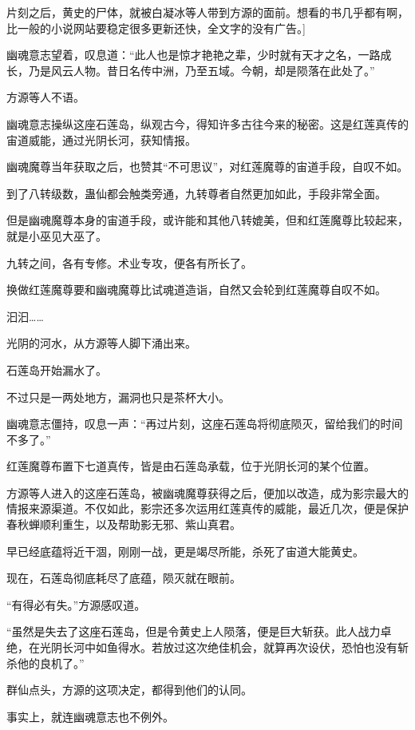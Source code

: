 
\begin{this_body}

片刻之后，黄史的尸体，就被白凝冰等人带到方源的面前。想看的书几乎都有啊，比一般的小说网站要稳定很多更新还快，全文字的没有广告。]

幽魂意志望着，叹息道：“此人也是惊才艳艳之辈，少时就有天才之名，一路成长，乃是风云人物。昔日名传中洲，乃至五域。今朝，却是陨落在此处了。”

方源等人不语。

幽魂意志操纵这座石莲岛，纵观古今，得知许多古往今来的秘密。这是红莲真传的宙道威能，通过光阴长河，获知情报。

幽魂魔尊当年获取之后，也赞其“不可思议”，对红莲魔尊的宙道手段，自叹不如。

到了八转级数，蛊仙都会触类旁通，九转尊者自然更加如此，手段非常全面。

但是幽魂魔尊本身的宙道手段，或许能和其他八转媲美，但和红莲魔尊比较起来，就是小巫见大巫了。

九转之间，各有专修。术业专攻，便各有所长了。

换做红莲魔尊要和幽魂魔尊比试魂道造诣，自然又会轮到红莲魔尊自叹不如。

汩汩……

光阴的河水，从方源等人脚下涌出来。

石莲岛开始漏水了。

不过只是一两处地方，漏洞也只是茶杯大小。

幽魂意志僵持，叹息一声：“再过片刻，这座石莲岛将彻底陨灭，留给我们的时间不多了。”

红莲魔尊布置下七道真传，皆是由石莲岛承载，位于光阴长河的某个位置。

方源等人进入的这座石莲岛，被幽魂魔尊获得之后，便加以改造，成为影宗最大的情报来源渠道。不仅如此，影宗还多次运用红莲真传的威能，最近几次，便是保护春秋蝉顺利重生，以及帮助影无邪、紫山真君。

早已经底蕴将近干涸，刚刚一战，更是竭尽所能，杀死了宙道大能黄史。

现在，石莲岛彻底耗尽了底蕴，陨灭就在眼前。

“有得必有失。”方源感叹道。

“虽然是失去了这座石莲岛，但是令黄史上人陨落，便是巨大斩获。此人战力卓绝，在光阴长河中如鱼得水。若放过这次绝佳机会，就算再次设伏，恐怕也没有斩杀他的良机了。”

群仙点头，方源的这项决定，都得到他们的认同。

事实上，就连幽魂意志也不例外。


\end{this_body}
